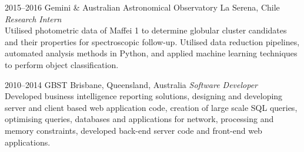 \begin{entrylist}
\entry
{2015--2016}
{Gemini \& Australian Astronomical Observatory}
{La Serena, Chile}
{\emph{Research Intern} \\
Utilised photometric data of Maffei 1 to determine globular cluster candidates and their properties for spectroscopic follow-up. Utilised data reduction pipelines, automated analysis methods in Python, and applied machine learning techniques to perform object classification.}

\entry
{2010--2014}
{GBST}
{Brisbane, Queensland, Australia}
{\emph{Software Developer} \\
Developed business intelligence reporting solutions, designing and developing server and client based web application code, creation of large scale SQL queries, optimising queries, databases and applications for network, processing and memory constraints, developed back-end server code and front-end web applications.}


\end{entrylist}





